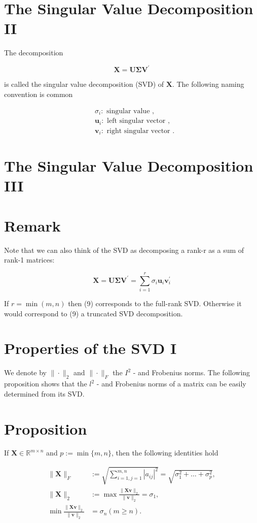 \documentclass[11pt]{article}
\theoremstyle{plain} %
\theoremstyle{remark}
\begin{document}
\section*{The Singular Value Decomposition II}
The decomposition

$$
\mathbf{X}=\mathbf{U} \boldsymbol{\Sigma} \mathbf{V}^{\prime}
$$

is called the singular value decomposition (SVD) of $\mathbf{X}$. The following naming convention is common

$$
\begin{aligned}
& \sigma_{i}: \text { singular value }, \\
& \mathbf{u}_{i}: \text { left singular vector }, \\
& \mathbf{v}_{i}: \text { right singular vector } .
\end{aligned}
$$

\section*{The Singular Value Decomposition III}
\section*{Remark}
Note that we can also think of the SVD as decomposing a rank-r as a sum of rank-1 matrices:

$$
\mathbf{X}=\mathbf{U} \boldsymbol{\Sigma} \mathbf{V}^{\prime}=\sum_{i=1}^{r} \sigma_{i} \mathbf{u}_{i} \mathbf{v}_{i}^{\prime}
$$

If $r=\min (m, n)$ then (9) corresponds to the full-rank SVD. Otherwise it would correspond to (9) a truncated SVD decomposition.

\section*{Properties of the SVD I}
We denote by $\|\cdot\|_{2}$ and $\|\cdot\|_{F}$ the $I^{2}$ - and Frobenius norms. The following proposition shows that the $l^{2}$ - and Frobenius norms of a matrix can be easily determined from its SVD.

\section*{Proposition}
If $\mathbf{X} \in \mathbb{R}^{m \times n}$ and $p:=\min \{m, n\}$, then the following identities hold

$$
\begin{aligned}
\|\mathbf{X}\|_{F} & :=\sqrt{\sum_{i=1, j=1}^{m, n}\left|a_{i j}\right|^{2}}=\sqrt{\sigma_{1}^{2}+\ldots+\sigma_{p}^{2}}, \\
\|\mathbf{X}\|_{2} & :=\max \frac{\|\mathbf{X} \mathbf{v}\|_{2}}{\|\mathbf{v}\|_{2}}=\sigma_{1}, \\
\min \frac{\|\mathbf{X} \mathbf{v}\|_{2}}{\|\mathbf{v}\|_{2}} & =\sigma_{n}(m \geq n) .
\end{aligned}
$$
\end{document}
